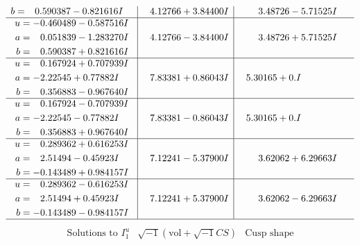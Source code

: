 \documentclass[1p]{elsarticle_modified}
\theoremstyle{definition}
\newcommand{\I}{\sqrt{-1}}
\begin{document}
$$\begin{array}{c|c|c}
\begin{aligned}
b &= \phantom{-}0.590387 - 0.821616 I\end{aligned}
 & \phantom{-}4.12766 + 3.84400 I & \phantom{-}3.48726 - 5.71525 I \\ \hline\begin{aligned}
u &= -0.460489 - 0.587516 I \\
a &= \phantom{-}0.051839 - 1.283270 I \\
b &= \phantom{-}0.590387 + 0.821616 I\end{aligned}
 & \phantom{-}4.12766 - 3.84400 I & \phantom{-}3.48726 + 5.71525 I \\ \hline\begin{aligned}
u &= \phantom{-}0.167924 + 0.707939 I \\
a &= -2.22545 + 0.77882 I \\
b &= \phantom{-}0.356883 - 0.967640 I\end{aligned}
 & \phantom{-}7.83381 + 0.86043 I & \phantom{-}5.30165 + 0. I\phantom{ +0.000000I} \\ \hline\begin{aligned}
u &= \phantom{-}0.167924 - 0.707939 I \\
a &= -2.22545 - 0.77882 I \\
b &= \phantom{-}0.356883 + 0.967640 I\end{aligned}
 & \phantom{-}7.83381 - 0.86043 I & \phantom{-}5.30165 + 0. I\phantom{ +0.000000I} \\ \hline\begin{aligned}
u &= \phantom{-}0.289362 + 0.616253 I \\
a &= \phantom{-}2.51494 - 0.45923 I \\
b &= -0.143489 + 0.984157 I\end{aligned}
 & \phantom{-}7.12241 - 5.37900 I & \phantom{-}3.62062 + 6.29663 I \\ \hline\begin{aligned}
u &= \phantom{-}0.289362 - 0.616253 I \\
a &= \phantom{-}2.51494 + 0.45923 I \\
b &= -0.143489 - 0.984157 I\end{aligned}
 & \phantom{-}7.12241 + 5.37900 I & \phantom{-}3.62062 - 6.29663 I\\
 \hline 
 \end{array}$$\newpage$$\begin{array}{c|c|c}  
\text{Solutions to }I^u_{1}& \I (\text{vol} + \sqrt{-1}CS) & \text{Cusp shape}\\
 \hline 
\begin{aligned}

\end{aligned}
\end{array}$$
\end{document}
